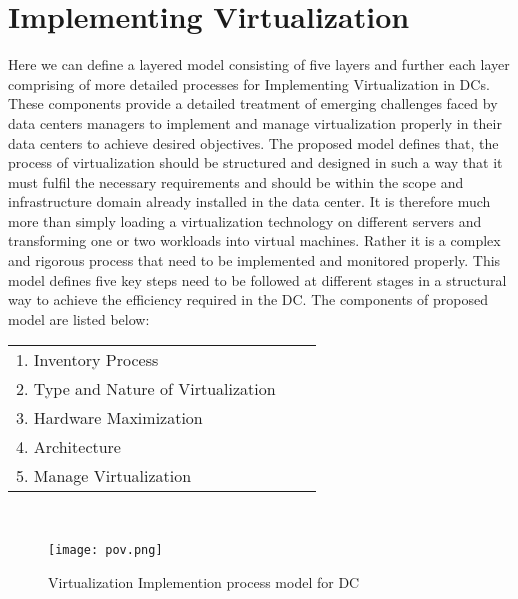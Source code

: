 \documentclass[12pt,a4paper]{report}
\begin{document}
\newpage
\section{Implementing Virtualization}
Here we can define a layered model consisting of five layers and further each layer comprising of more detailed processes for Implementing Virtualization in DCs. These components provide a detailed treatment of emerging challenges faced by data centers managers to implement and manage virtualization properly in their data centers to achieve desired objectives. The proposed model defines that, the process of virtualization should be structured and designed in such a way that it must fulfil the necessary requirements and should be within the scope and infrastructure domain already installed in the data center. It is therefore much more than simply loading a virtualization technology on different servers and transforming one or two workloads into virtual machines. Rather it is a complex and rigorous process that need to be implemented and monitored properly. This model defines five key steps need to be followed at different stages in a structural way to achieve the efficiency required in the DC. The components of proposed model are listed below:\\
\hspace*{0.1 in}
\begin{tabular}{lll}
\vspace*{0.1 in}
1. Inventory Process &\\
\vspace*{0.1 in}
2. Type and Nature of Virtualization &\\
\vspace*{0.1 in}
3. Hardware Maximization &\\
\vspace*{0.1 in}
4. Architecture &\\
\vspace*{0.1 in}
5. Manage Virtualization &\\
\end{tabular}\\

 \begin{figure}[]
\begin{center}
\texttt{[image: pov.png]}
\caption{Virtualization Implemention process model for DC}
\end{center}
\end{figure}
\end{document}
